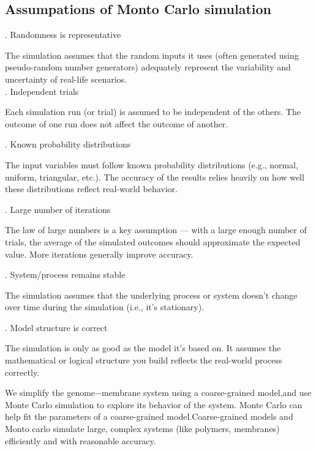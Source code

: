 \documentclass[12pt]{article}
\begin{document}
\begin{flushleft}
\subsection*{Assumpations of Monto Carlo simulation}


. Randomness is representative
    
The simulation assumes that the random inputs it uses (often generated using pseudo-random number generators) adequately represent the variability and uncertainty of real-life scenarios.\\

. Independent trials
    
Each simulation run (or trial) is assumed to be independent of the others. The outcome of one run does not affect the outcome of another.

. Known probability distributions
    
The input variables must follow known probability distributions (e.g., normal, uniform, triangular, etc.). The accuracy of the results relies heavily on how well these distributions reflect real-world behavior.

. Large number of iterations
    
The law of large numbers is a key assumption — with a large enough number of trials, the average of the simulated outcomes should approximate the expected value. More iterations generally improve accuracy.

. System/process remains stable
    
The simulation assumes that the underlying process or system doesn’t change over time during the simulation (i.e., it's stationary).

. Model structure is correct

The simulation is only as good as the model it's based on. It assumes the mathematical or logical structure you build reflects the real-world process correctly.


We simplify the genome$-$membrane system using a coarse-grained model,and use Monte Carlo simulation to explore its behavior of the system. Monte Carlo can help fit the parameters of a coarse-grained model.Coarse-grained models and Monto carlo simulate large, complex systems (like polymers, membranes) efficiently and with reasonable accuracy.










\end{flushleft}
\end{document}
